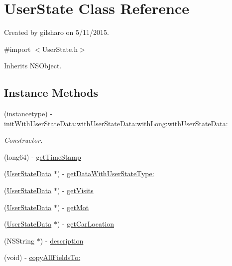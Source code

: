\hypertarget{interface_user_state}{}\section{User\+State Class Reference}
\label{interface_user_state}


Created by gilsharo on 5/11/2015.  




{\ttfamily \#import $<$User\+State.\+h$>$}



Inherits N\+S\+Object.

\subsection*{Instance Methods}
\begin{DoxyCompactItemize}
\item 
(instancetype) -\/ \hyperlink{interface_user_state_ad04219122faaa5133fc6f7c6359933e2}{init\+With\+User\+State\+Data\+:with\+User\+State\+Data\+:with\+Long\+:with\+User\+State\+Data\+:}
\begin{DoxyCompactList}\small\item\em Constructor. \end{DoxyCompactList}\item 
(long64) -\/ \hyperlink{interface_user_state_adb43df918350fda415d0d93831f4059c}{get\+Time\+Stamp}
\item 
(\hyperlink{interface_user_state_data}{User\+State\+Data} $\ast$) -\/ \hyperlink{interface_user_state_af97c72576f257ef85f99df8be69caaf4}{get\+Data\+With\+User\+State\+Type\+:}
\item 
(\hyperlink{interface_user_state_data}{User\+State\+Data} $\ast$) -\/ \hyperlink{interface_user_state_a270a329f3c61b1edae8725d843f8e55f}{get\+Visits}
\item 
(\hyperlink{interface_user_state_data}{User\+State\+Data} $\ast$) -\/ \hyperlink{interface_user_state_ac488b9f5106915cadf005eff87e6bb4e}{get\+Mot}
\item 
(\hyperlink{interface_user_state_data}{User\+State\+Data} $\ast$) -\/ \hyperlink{interface_user_state_a80add64f4a7e407653335bb8df4391b4}{get\+Car\+Location}
\item 
(N\+S\+String $\ast$) -\/ \hyperlink{interface_user_state_af430772ec0653467fb19d0988b0f434a}{description}
\item 
(void) -\/ \hyperlink{interface_user_state_abfec66bbb052ca94ebaac7e7d4ff9ed6}{copy\+All\+Fields\+To\+:}
\end{DoxyCompactItemize}
